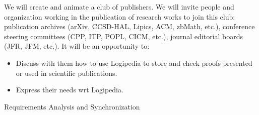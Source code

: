 \begin{workpackage}[id=dissemination,wphases=0-48,type=MGT,
  short=Dissemination,%
  title={Dissemination, communication, and exploitation},
  lead=Inr,
  BolRM=3,
  InrRM=10]
\begin{tasklist}
  \begin{task}[id=publishers,title=Expanding the use of Logipedia in publishing]
    We will create and animate a club of publishers. We will invite
    people and organization working in the publication of research
    works to join this club: publication archives (arXiv, CCSD-HAL,
    Lipics, ACM, zbMath, etc.), conference steering committees (CPP,
    ITP, POPL, CICM, etc.), journal editorial boards (JFR, JFM,
    etc.). It will be an opportunity to:
    \begin{itemize}
    \item Discuss with them how to use Logipedia to store and check
      proofs presented or used in scientific publications.
    \item Express their needs wrt Logipedia.
    \end{itemize}
  \end{task}
\end{tasklist}

\begin{wpdelivs}
  \begin{wpdeliv}[due=3,miles=startup,id=requirements,dissem=PU,nature=DEM,lead=Inr]
      {Requirements Analysis and Synchronization}
\end{wpdeliv}
\end{wpdelivs}
\end{workpackage}


